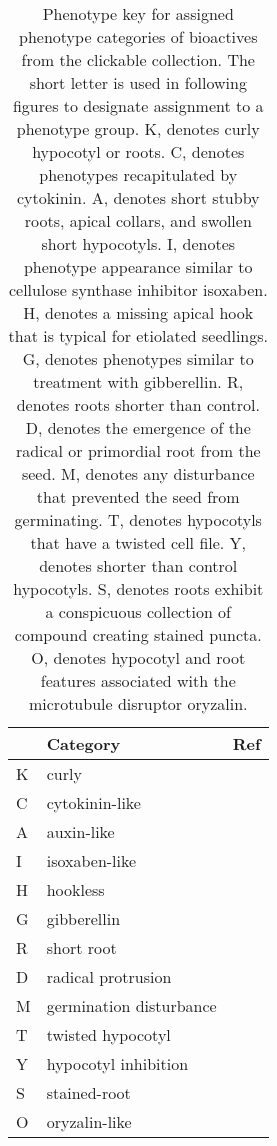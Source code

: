 \begin{table}\centering
    \begin{tabular}{|l|l|l|}
    \hline
      & Category & Ref          \\ \hline
    K & curly &                 \\ \hline
    C & cytokinin-like  & \cite{vogel1998isolation} \\ \hline
    A & auxin-like & \cite{zhao2003sir1}      \\ \hline
    I & isoxaben-like & \cite{debolt2007morlin}    \\ \hline
    H & hookless  & \cite{guzman1990exploiting}        \\ \hline
    G & gibberellin &            \\ \hline
    R & short root &            \\ \hline
    D & radical protrusion &    \\ \hline
    M & germination disturbance & \\ \hline
    T & twisted hypocotyl &     \\ \hline
    Y & hypocotyl inhibition &  \\ \hline
    S & stained-root &          \\ \hline
    O & oryzalin-like & \cite{nakamura2004low}   \\ \hline
    \end{tabular}
    \caption {Phenotype key for assigned phenotype categories of bioactives from the clickable collection. The short letter is used in following figures to designate assignment to a phenotype group. K, denotes curly hypocotyl or roots. C, denotes phenotypes recapitulated by cytokinin. A, denotes short stubby roots, apical collars, and swollen short hypocotyls. I, denotes phenotype appearance similar to cellulose synthase inhibitor isoxaben. H, denotes a missing apical hook that is typical for etiolated seedlings. G, denotes phenotypes similar to treatment with gibberellin. R, denotes roots shorter than control. D, denotes the emergence of the radical or primordial root from the seed. M, denotes any disturbance that prevented the seed from germinating. T, denotes hypocotyls that have a twisted cell file. Y, denotes shorter than control hypocotyls. S, denotes roots exhibit a conspicuous collection of compound creating stained puncta. O, denotes hypocotyl and root features associated with the microtubule disruptor oryzalin.}
    \label{table:PhenotypeAnnotationKey}
\end{table}
\clearpage


